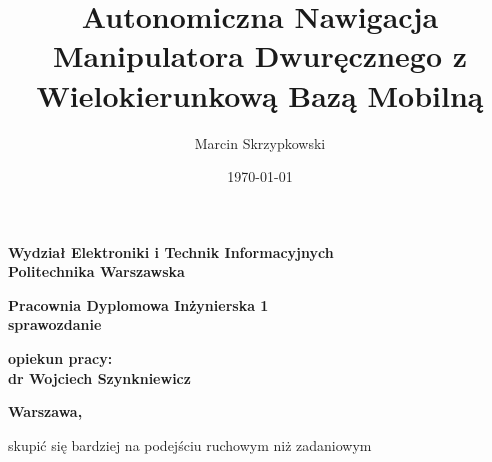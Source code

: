 \documentclass{report}
\title{Autonomiczna Nawigacja Manipulatora Dwuręcznego z Wielokierunkową Bazą Mobilną}
\date{\today}
\author{Marcin Skrzypkowski}
\begin{document}
	
	
	\makeatletter
	\renewcommand{\maketitle}{\begin{titlepage}
		\begin{center}{\LARGE {\bf Wydział Elektroniki i Technik Informacyjnych}}\\
			\vspace{0.4cm}
			{\LARGE {\bf Politechnika Warszawska}}\\
			\vspace{0.3cm}
		\end{center}
		\vspace{5cm}
		\begin{center}
			{\bf \LARGE Pracownia Dyplomowa Inżynierska  1\\ sprawozdanie  \vskip 0.1cm}
		\end{center}
		\vspace{1cm}
		\begin{center}
			{\bf \LARGE \@title}
		\end{center}
		\vspace{2cm}
		\begin{center}
			{\bf \Large \@author \par}
		\end{center}
		\vspace*{\stretch{1}}
		\begin{center}
			{\bf \large opiekun pracy: \\ dr Wojciech Szynkniewicz\par}
		\end{center}
		\vspace*{\stretch{5}}
		\begin{center}
			\bf{\large{Warszawa, \@date\vskip 0.1cm}}
		\end{center}
		\end{titlepage}
}
\makeatother	


	

	\maketitle
	\newpage



	\tableofcontents

	\newpage
	\doublespacing
skupić się bardziej na podejściu ruchowym niż zadaniowym 	
	
\end{document}
